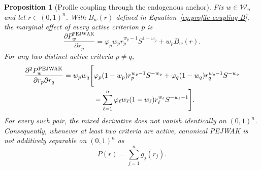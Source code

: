 \documentclass[reqno,11pt]{amsart}
\theoremstyle{definition}
\theoremstyle{plain}
\newtheorem{proposition}{Proposition}
\theoremstyle{remark}
\begin{document}
\begin{proposition}[Profile coupling through the endogenous anchor]
Fix $w\in\mathcal W_n$ and let $r\in(0,1)^n$. With $B_w(r)$ defined
in Equation~\eqref{eq:profile-coupling-B}, the marginal effect of every
active criterion $p$ is
\begin{equation}
\frac{\partial P_w^{\mathrm{PEJWAK}}}{\partial r_p}
=
\varphi_pw_pr_p^{w_p-1}S^{1-w_p}
+
w_pB_w(r).
\label{eq:pejwak-gradient}
\end{equation}
For any two distinct active criteria $p\neq q$,
\begin{align}
\frac{\partial^2P_w^{\mathrm{PEJWAK}}}
{\partial r_p\partial r_q}
=
w_pw_q\Bigg[
&
\varphi_p(1-w_p)
r_p^{w_p-1}S^{-w_p}
+
\varphi_q(1-w_q)
r_q^{w_q-1}S^{-w_q}
\notag\\
&
-
\sum_{\ell=1}^{n}
\varphi_\ell w_\ell(1-w_\ell)
r_\ell^{w_\ell}S^{-w_\ell-1}
\Bigg].
\label{eq:pejwak-mixed-partial}
\end{align}
For every such pair, the mixed derivative does not vanish identically
on $(0,1)^n$. Consequently, whenever at least two criteria are active,
canonical PEJWAK is not additively separable on $(0,1)^n$ as
\[
P(r)=\sum_{j=1}^{n}g_j(r_j).
\]
\end{proposition}
\end{document}

